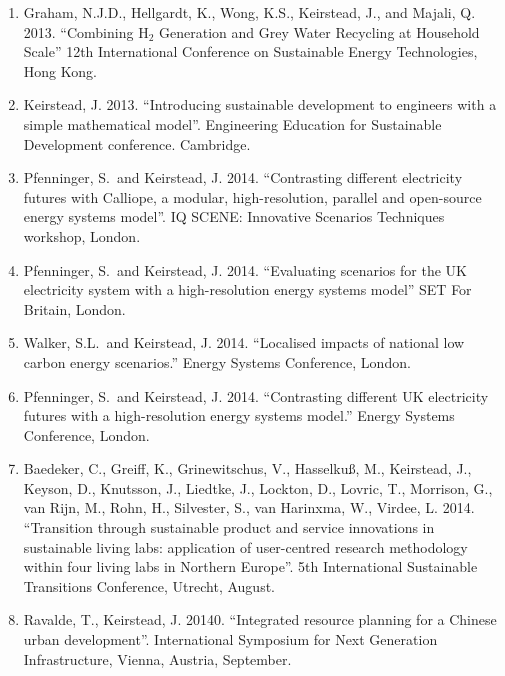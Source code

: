 \documentclass[11pt,a4paper]{article}
\begin{document}
\begin{enumerate}
\item Graham, N.J.D., Hellgardt, K., Wong, K.S., Keirstead, J., and Majali, Q. 2013. ``Combining H$_2$ Generation and Grey Water Recycling at Household Scale'' 12th International Conference on Sustainable Energy Technologies, Hong Kong.

\item Keirstead, J. 2013. ``Introducing sustainable development to engineers with a simple mathematical model''.  Engineering Education for Sustainable Development conference.  Cambridge.

\item Pfenninger, S.\ and Keirstead, J. 2014. ``Contrasting different electricity futures with Calliope, a modular, high-resolution, parallel and open-source energy systems model''.  IQ SCENE: Innovative Scenarios Techniques workshop, London.

\item Pfenninger, S.\ and Keirstead, J. 2014. ``Evaluating scenarios for the UK electricity system with a high-resolution energy systems model'' SET For Britain, London.

\item Walker, S.L.\ and Keirstead, J. 2014. ``Localised impacts of national low carbon energy scenarios.''  Energy Systems Conference, London.

\item Pfenninger, S.\ and Keirstead, J. 2014. ``Contrasting different UK electricity futures with a high-resolution energy systems model.''  Energy Systems Conference, London.

\item Baedeker, C., Greiff, K., Grinewitschus, V., Hasselku{\ss}, M., Keirstead, J., Keyson, D., Knutsson, J., Liedtke, J., Lockton, D., Lovric, T., Morrison, G., van Rijn, M., Rohn, H., Silvester, S., van Harinxma, W., Virdee, L. 2014. ``Transition through sustainable product and service innovations in sustainable living labs: application of user-centred research methodology within four living labs in Northern Europe''.  5th International Sustainable Transitions Conference, Utrecht, August. 

\item Ravalde, T., Keirstead, J. 20140. ``Integrated resource planning for a Chinese urban development''. International Symposium for Next Generation Infrastructure, Vienna, Austria, September.

\end{enumerate}

\bigskip
\end{document}
